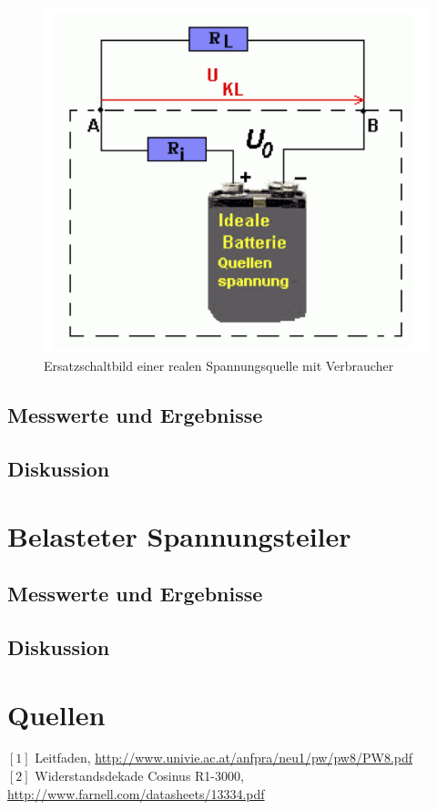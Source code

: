 \documentclass[12pt,a4paper]{article}
\begin{document}
\begin{multicols}{2}
\begin{figure}[H]
	\centering
	\includegraphics[scale=0.80]{./figure/innenwiderstand_schaltskizze.png}
	\caption{Ersatzschaltbild einer realen Spannungsquelle mit Verbraucher}
	\label{fig:innenwiderstand_schaltskizze}
\end{figure}







\subsection{Messwerte und Ergebnisse}


\subsection{Diskussion}


\section{Belasteter Spannungsteiler}

\subsection{Messwerte und Ergebnisse}


\subsection{Diskussion}



\section{Quellen}
$[1]$ Leitfaden, \url{http://www.univie.ac.at/anfpra/neu1/pw/pw8/PW8.pdf}\\
$[2]$ Widerstandsdekade Cosinus R1-3000, \url{http://www.farnell.com/datasheets/13334.pdf}\\

\end{multicols}
\end{document}
